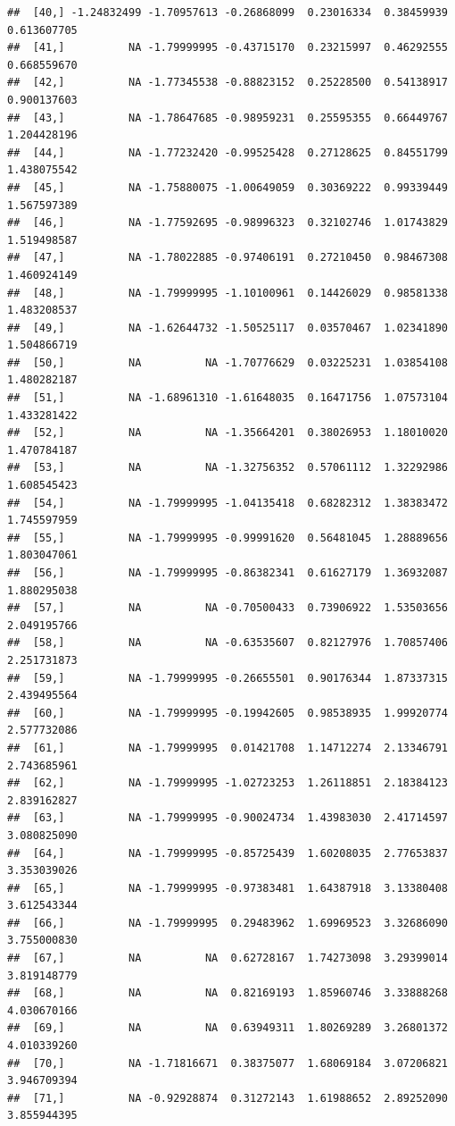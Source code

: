 \documentclass{article}\usepackage[]{graphicx}\usepackage[]{color}
\makeatletter
\newenvironment{kframe}{%
 \def\at@end@of@kframe{}%
 \ifinner\ifhmode%
  \def\at@end@of@kframe{\end{minipage}}%
  \begin{minipage}{\columnwidth}%
 \fi\fi%
 \def\FrameCommand##1{\hskip\@totalleftmargin \hskip-\fboxsep
 \colorbox{shadecolor}{##1}\hskip-\fboxsep
     \hskip-\linewidth \hskip-\@totalleftmargin \hskip\columnwidth}%
 \MakeFramed {\advance\hsize-\width
   \@totalleftmargin\z@ \linewidth\hsize
   \@setminipage}}%
 {\par\unskip\endMakeFramed%
 \at@end@of@kframe}
\newenvironment{knitrout}{}{} %
\makeatother
\begin{document}
\begin{knitrout}
\begin{kframe}
\begin{verbatim}
##  [40,] -1.24832499 -1.70957613 -0.26868099  0.23016334  0.38459939  0.613607705
##  [41,]          NA -1.79999995 -0.43715170  0.23215997  0.46292555  0.668559670
##  [42,]          NA -1.77345538 -0.88823152  0.25228500  0.54138917  0.900137603
##  [43,]          NA -1.78647685 -0.98959231  0.25595355  0.66449767  1.204428196
##  [44,]          NA -1.77232420 -0.99525428  0.27128625  0.84551799  1.438075542
##  [45,]          NA -1.75880075 -1.00649059  0.30369222  0.99339449  1.567597389
##  [46,]          NA -1.77592695 -0.98996323  0.32102746  1.01743829  1.519498587
##  [47,]          NA -1.78022885 -0.97406191  0.27210450  0.98467308  1.460924149
##  [48,]          NA -1.79999995 -1.10100961  0.14426029  0.98581338  1.483208537
##  [49,]          NA -1.62644732 -1.50525117  0.03570467  1.02341890  1.504866719
##  [50,]          NA          NA -1.70776629  0.03225231  1.03854108  1.480282187
##  [51,]          NA -1.68961310 -1.61648035  0.16471756  1.07573104  1.433281422
##  [52,]          NA          NA -1.35664201  0.38026953  1.18010020  1.470784187
##  [53,]          NA          NA -1.32756352  0.57061112  1.32292986  1.608545423
##  [54,]          NA -1.79999995 -1.04135418  0.68282312  1.38383472  1.745597959
##  [55,]          NA -1.79999995 -0.99991620  0.56481045  1.28889656  1.803047061
##  [56,]          NA -1.79999995 -0.86382341  0.61627179  1.36932087  1.880295038
##  [57,]          NA          NA -0.70500433  0.73906922  1.53503656  2.049195766
##  [58,]          NA          NA -0.63535607  0.82127976  1.70857406  2.251731873
##  [59,]          NA -1.79999995 -0.26655501  0.90176344  1.87337315  2.439495564
##  [60,]          NA -1.79999995 -0.19942605  0.98538935  1.99920774  2.577732086
##  [61,]          NA -1.79999995  0.01421708  1.14712274  2.13346791  2.743685961
##  [62,]          NA -1.79999995 -1.02723253  1.26118851  2.18384123  2.839162827
##  [63,]          NA -1.79999995 -0.90024734  1.43983030  2.41714597  3.080825090
##  [64,]          NA -1.79999995 -0.85725439  1.60208035  2.77653837  3.353039026
##  [65,]          NA -1.79999995 -0.97383481  1.64387918  3.13380408  3.612543344
##  [66,]          NA -1.79999995  0.29483962  1.69969523  3.32686090  3.755000830
##  [67,]          NA          NA  0.62728167  1.74273098  3.29399014  3.819148779
##  [68,]          NA          NA  0.82169193  1.85960746  3.33888268  4.030670166
##  [69,]          NA          NA  0.63949311  1.80269289  3.26801372  4.010339260
##  [70,]          NA -1.71816671  0.38375077  1.68069184  3.07206821  3.946709394
##  [71,]          NA -0.92928874  0.31272143  1.61988652  2.89252090  3.855944395

\end{verbatim}
\end{kframe}
\end{knitrout}
\end{document}
